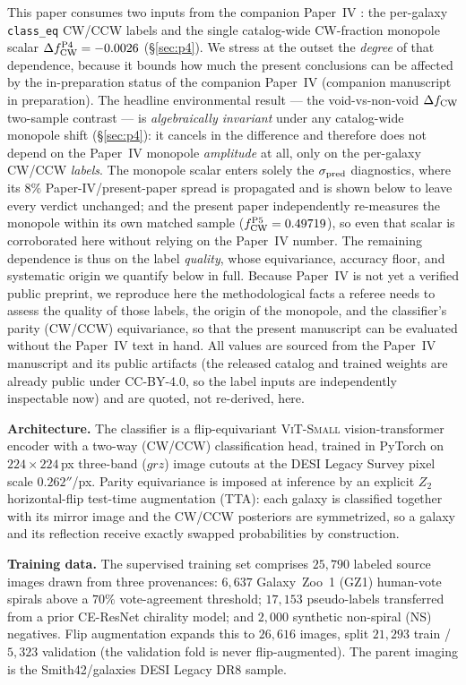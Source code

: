 \documentclass[aps,prd,twocolumn,superscriptaddress,showpacs,preprintnumbers,nofootinbib,longbibliography,floatfix]{revtex4-2}
\newcommand{\paperIVarxiv}{companion manuscript in preparation}
\begin{document}
This paper consumes two inputs from the companion Paper~IV
\cite{golden_chirality_2026}: the per-galaxy \texttt{class\_eq} CW/CCW
labels and the single catalog-wide CW-fraction monopole scalar
$\Delta f_{\rm CW}^{\rm P4}=-0.0026$ (\S\ref{sec:p4}). We stress at the
outset the \emph{degree} of that dependence, because it bounds how much
the present conclusions can be affected by the in-preparation status of
the companion Paper~IV (\paperIVarxiv). The headline environmental result --- the void-vs-non-void
$\Delta f_{\rm CW}$ two-sample contrast --- is \emph{algebraically
invariant} under any catalog-wide monopole shift (\S\ref{sec:p4}): it
cancels in the difference and therefore does not depend on the Paper~IV
monopole \emph{amplitude} at all, only on the per-galaxy CW/CCW
\emph{labels}. The monopole scalar enters solely the $\sigma_{\rm pred}$
diagnostics, where its $8\%$ Paper-IV/present-paper spread is propagated
and is shown below to leave every verdict unchanged; and the present
paper independently re-measures the monopole within its own matched
sample ($f_{\rm CW}^{\rm P5}=0.49719$), so even that scalar is
corroborated here without relying on the Paper~IV number. The remaining
dependence is thus on the label \emph{quality}, whose equivariance,
accuracy floor, and systematic origin we quantify below in full.
Because Paper~IV is not yet a verified public preprint, we reproduce here the
methodological facts a referee needs to assess the quality of those
labels, the origin of the monopole, and the classifier's parity
(CW/CCW) equivariance, so that the present manuscript can be evaluated
without the Paper~IV text in hand. All values are sourced from the
Paper~IV manuscript and its public artifacts (the released catalog and
trained weights are already public under CC-BY-4.0, so the label inputs
are independently inspectable now) and are quoted, not
re-derived, here.

\textbf{Architecture.} The classifier is a flip-equivariant
\textsc{ViT-Small} vision-transformer encoder with a two-way
(CW/CCW) classification head, trained in PyTorch on
$224\times224$\,px three-band ($grz$) image cutouts at the
DESI Legacy Survey pixel scale $0.262''$/px. Parity equivariance is
imposed at inference by an explicit $Z_2$ horizontal-flip
test-time augmentation (TTA): each galaxy is classified together with
its mirror image and the CW/CCW posteriors are symmetrized, so a galaxy
and its reflection receive exactly swapped probabilities by
construction.

\textbf{Training data.} The supervised training set comprises
$25{,}790$ labeled source images drawn from three provenances:
$6{,}637$ Galaxy~Zoo~1 (GZ1) human-vote spirals above a $70\%$
vote-agreement threshold; $17{,}153$ pseudo-labels transferred from a
prior CE-ResNet chirality model; and $2{,}000$ synthetic
non-spiral (NS) negatives. Flip augmentation expands this to
$26{,}616$ images, split $21{,}293$ train / $5{,}323$ validation
(the validation fold is never flip-augmented). The parent imaging is
the Smith42/galaxies DESI Legacy DR8 sample.
\end{document}
